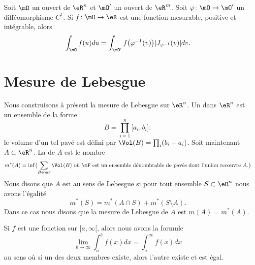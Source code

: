 \begin{theorem} \label{ThomFeRCi}
    Soit \( \mO\) un ouvert de \( \eR^n\) et \( \mO'\) un ouvert de \( \eR^m\). Soit \( \varphi\colon \mO\to \mO'\) un difféomorphisme \( C^1\). Si \( f\colon \mO\to \eR\) est une fonction mesurable, positive et intégrable, alors
    \begin{equation}
        \int_{\mO}f(u)du=\int_{\mO'}f\big( \varphi^{-1}(v) \big)| J_{\varphi^{-1}}(v) |dv.
    \end{equation}
\end{theorem}

\section{Mesure de Lebesgue}

Nous construisons à présent la mesure de Lebesgue sur \( \eR^n\). Un  dans \( \eR^n\) est un ensemble de la forme 
\begin{equation}
    B=\prod_{i=1}^n\mathopen[ a_i , b_i \mathclose];
\end{equation}
le volume d'un tel pavé est défini par \( \Vol(B)=\prod_i(b_i-a_i)\). Soit maintenant \( A\subset \eR^n\). La  de \( A\) est le nombre
\begin{equation}
    m^*(A)=\inf\{ \sum_{B\in\mF}\Vol(B)\text{ où \( \mF\) est un ensemble dénombrable de pavés dont l'union recouvre \( A\).} \}
\end{equation}
Nous disons que \( A\) est  au sens de Lebesgue si pour tout ensemble \( S\subset \eR^n\) nous avons l'égalité
\begin{equation}
    m^*(S)=m^*(A\cap S)+m^*(S\setminus A).
\end{equation}
Dans ce cas nous disons que la mesure de Lebesgue de \( A\) est \( m(A)=m^*(A)\).

\begin{lemma}\label{LemTHBSEs}
    Si \( f\) est une fonction sur \( \mathopen[ a , \infty [\), alors nous avons la formule
    \begin{equation}
        \lim_{b\to \infty}\int_a^bf(x)dx=\int_a^{\infty}f(x)dx
    \end{equation}
    au sens où si un des deux membres existe, alors l'autre existe et est égal.
\end{lemma}

